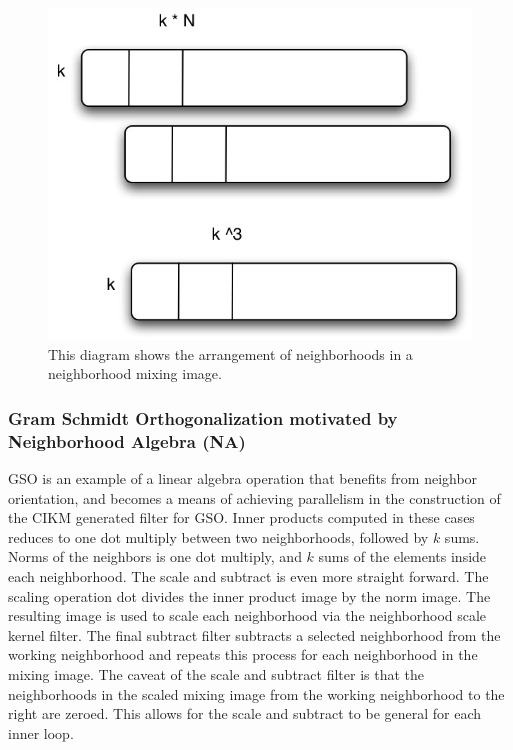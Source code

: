 \documentclass[11pt]{article}
\begin{document}
\begin{figure}[htbp] %
   \centering
   \includegraphics[width=5in]{../../assignment1/combinedReport/neighborhoodArrangement.jpg} 
   \caption{This diagram shows the arrangement of neighborhoods in a neighborhood mixing image. }
   \label{neighborhoodArrangement}
\end{figure}



\subsubsection{Gram Schmidt Orthogonalization motivated by Neighborhood Algebra (NA)}

GSO is an example of a linear algebra operation that benefits from neighbor orientation, and becomes a means of achieving parallelism in the construction of the CIKM generated filter for GSO.
Inner products computed in these cases reduces to one dot multiply between two neighborhoods, followed by $k$ sums.   Norms of the neighbors is one dot multiply, and $k$ sums of the elements inside each neighborhood. The scale and subtract is even more straight forward.  The scaling operation dot divides the inner product image by the norm image.  The resulting image is used to scale each neighborhood via the neighborhood scale kernel filter.  The final subtract filter subtracts a selected neighborhood from the working neighborhood and repeats this process for each neighborhood in the mixing image.  The caveat of the scale and subtract filter is that the neighborhoods in the scaled mixing image from the working neighborhood to the right are zeroed.  This allows for the scale and subtract to be general for each inner loop.
\end{document}
